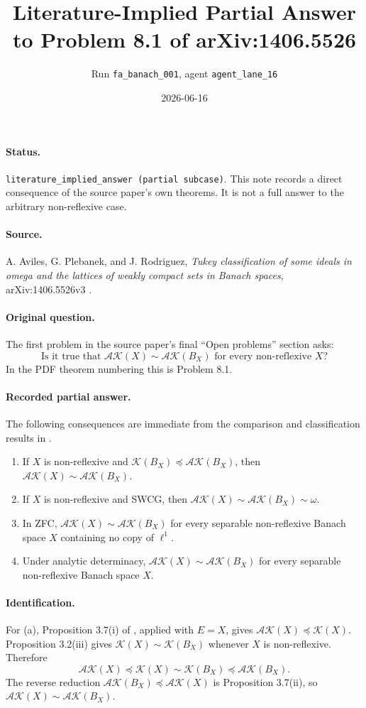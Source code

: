 \documentclass[11pt]{article}
\title{Literature-Implied Partial Answer to Problem 8.1 of arXiv:1406.5526}
\author{Run \texttt{fa\_banach\_001}, agent \texttt{agent\_lane\_16}}
\date{2026-06-16}
\newcommand{\AK}{\mathcal{AK}}
\newcommand{\cK}{\mathcal{K}}
\newcommand{\pre}{\preceq}
\newcommand{\om}{\omega}
\begin{document}
\maketitle

\paragraph{Status.}
\texttt{literature\_implied\_answer (partial subcase)}.  This note records a
direct consequence of the source paper's own theorems.  It is not a full answer
to the arbitrary non-reflexive case.

\paragraph{Source.}
A. Aviles, G. Plebanek, and J. Rodriguez, \emph{Tukey classification of some
ideals in omega and the lattices of weakly compact sets in Banach spaces},
arXiv:1406.5526v3 \cite{APR}.

\paragraph{Original question.}
The first problem in the source paper's final ``Open problems'' section asks:
\[
  \text{Is it true that } \AK(X)\sim \AK(B_X)
  \text{ for every non-reflexive } X?
\]
In the PDF theorem numbering this is Problem 8.1.

\paragraph{Recorded partial answer.}
The following consequences are immediate from the comparison and classification
results in \cite{APR}.

\begin{enumerate}[label=(\alph*)]
\item If \(X\) is non-reflexive and \(\cK(B_X)\pre \AK(B_X)\), then
  \(\AK(X)\sim \AK(B_X)\).
\item If \(X\) is non-reflexive and SWCG, then
  \(\AK(X)\sim \AK(B_X)\sim \om\).
\item In ZFC, \(\AK(X)\sim\AK(B_X)\) for every separable non-reflexive Banach
  space \(X\) containing no copy of \(\ell^1\).
\item Under analytic determinacy, \(\AK(X)\sim\AK(B_X)\) for every separable
  non-reflexive Banach space \(X\).
\end{enumerate}

\paragraph{Identification.}
For (a), Proposition 3.7(i) of \cite{APR}, applied with \(E=X\), gives
\(\AK(X)\pre \cK(X)\).  Proposition 3.2(iii) gives
\(\cK(X)\sim\cK(B_X)\) whenever \(X\) is non-reflexive.  Therefore
\[
  \AK(X)\pre \cK(X)\sim \cK(B_X)\pre \AK(B_X).
\]
The reverse reduction \(\AK(B_X)\pre\AK(X)\) is Proposition 3.7(ii), so
\(\AK(X)\sim\AK(B_X)\).
\end{document}
